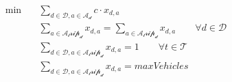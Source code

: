 \begin{align}
  \min\quad & \sum_{d \in \mathcal{D}, a \in \mathcal{A_d}} c \cdot x_{d,a} \tag{objective} \\
  & \sum_{a \in \mathcal{A_trip_d}} x_{d,a} = \sum_{a \in \mathcal{A_trip_d}} x_{d,a} \qquad \forall d \in \mathcal{D} \tag{flow\_conservation} \\
  & \sum_{d \in \mathcal{D}, a \in \mathcal{A_trip_d}} x_{d,a} = 1 \qquad \forall t \in \mathcal{T} \tag{trip\_cover} \\
  & \sum_{d \in \mathcal{D}, a \in \mathcal{A_trip_d}} x_{d,a} = \mathit{maxVehicles} \tag{depot\_outflow\_cap} \\
\end{align}

